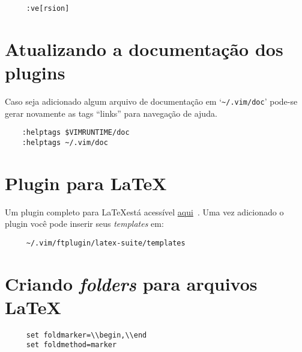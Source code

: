\begin{verbatim}
     :ve[rsion]
\end{verbatim}

\section{Atualizando a documentação dos plugins}\label{sec:Atualizando a documentação dos plugins}
Caso seja adicionado algum arquivo de documentação em `\verb+~/.vim/doc+' pode-se 
gerar novamente as tags ``links'' para navegação de ajuda.

\begin{verbatim}
    :helptags $VIMRUNTIME/doc
    :helptags ~/.vim/doc
\end{verbatim}


\section{Plugin para \LaTeX}
\label{Plugin para LaTeX}

Um plugin completo para \LaTeX está acessível
\href{http://vim-latex.sourceforge.net/}{aqui}~\cite{PluginLatex}. Uma vez adicionado o plugin você pode
inserir seus {\em templates} em:

\begin{verbatim}
     ~/.vim/ftplugin/latex-suite/templates
\end{verbatim}


\section{Criando {\em folders} para arquivos \LaTeX}
\label{Criando folders para arquivos LaTeX}

\begin{verbatim}
     set foldmarker=\\begin,\\end
     set foldmethod=marker
\end{verbatim}

